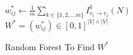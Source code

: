 \begin{algorithm}[H]
{{{            }
    
        }
    }
     $w^*_{ij} \gets \frac{1}{m}\sum_{k \in \{ 1, 2, ... m\}} I^k_{v_i \to v_j}(N)$ \\
     $W^* = (w^*_{ij}) \in [0,1]^{|V| \times |V|}$


    \caption{Random Forest To Find $W^*$}
\end{algorithm}